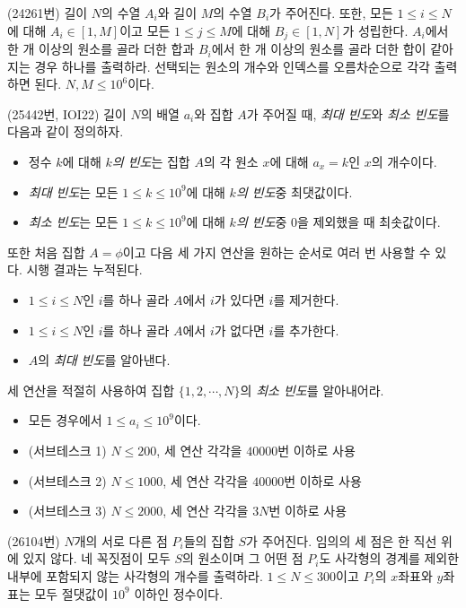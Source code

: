 \begin{problem}
    (24261번) 길이 $N$의 수열 $A_i$와 길이 $M$의 수열 $B_i$가 주어진다. 또한, 모든 $1 \leq i \leq N$에 대해 $A_i \in [1, M]$이고 모든 $1 \leq j \leq M$에 대해 $B_j \in [1, N]$가 성립한다. $A_i$에서 한 개 이상의 원소를 골라 더한 합과 $B_i$에서 한 개 이상의 원소를 골라 더한 합이 같아지는 경우 하나를 출력하라. 선택되는 원소의 개수와 인덱스를 오름차순으로 각각 출력하면 된다. $N, M \leq 10^6$이다.
\end{problem}

\begin{problem}
    (25442번, IOI22) 길이 $N$의 배열 $a_i$와 집합 $A$가 주어질 때, \textit{최대 빈도}와 \textit{최소 빈도}를 다음과 같이 정의하자.
    \begin{itemize}
        \item 정수 $k$에 대해 \textit{$k$의 빈도}는 집합 $A$의 각 원소 $x$에 대해 $a_x=k$인 $x$의 개수이다.
        \item \textit{최대 빈도}는 모든 $1 \leq k \leq 10^9$에 대해 \textit{$k$의 빈도}중 최댓값이다.
        \item \textit{최소 빈도}는 모든 $1 \leq k \leq 10^9$에 대해 \textit{$k$의 빈도}중 0을 제외했을 때 최솟값이다.
    \end{itemize}
    또한 처음 집합 $A = \phi$이고 다음 세 가지 연산을 원하는 순서로 여러 번 사용할 수 있다. 시행 결과는 누적된다.
    \begin{itemize}
        \item $1 \leq i \leq N$인 $i$를 하나 골라 $A$에서 $i$가 있다면 $i$를 제거한다.
        \item $1 \leq i \leq N$인 $i$를 하나 골라 $A$에서 $i$가 없다면 $i$를 추가한다.
        \item $A$의 \textit{최대 빈도}를 알아낸다.
    \end{itemize}
    세 연산을 적절히 사용하여 집합 $\{ 1, 2, \cdots, N \}$의 \textit{최소 빈도}를 알아내어라.
    \begin{itemize}
        \item 모든 경우에서 $1 \leq a_i \leq 10^9$이다.
        \item (서브테스크 1) $N \leq 200$, 세 연산 각각을 $40000$번 이하로 사용
        \item (서브테스크 2) $N \leq 1000$, 세 연산 각각을 $40000$번 이하로 사용
        \item (서브테스크 3) $N \leq 2000$, 세 연산 각각을 $3N$번 이하로 사용
    \end{itemize}
\end{problem}

\begin{problem}
    (26104번) $N$개의 서로 다른 점 $P_i$들의 집합 $S$가 주어진다. 임의의 세 점은 한 직선 위에 있지 않다. 네 꼭짓점이 모두 $S$의 원소이며 그 어떤 점 $P_i$도 사각형의 경계를 제외한 내부에 포함되지 않는 사각형의 개수를 출력하라. $1 \leq N \leq 300$이고 $P_i$의 $x$좌표와 $y$좌표는 모두 절댓값이 $10^9$ 이하인 정수이다.
\end{problem}